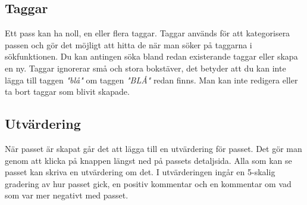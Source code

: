 \documentclass{article}
\newcommand{\button}[1]{{\tcbox{\textcolor{detail}{#1}}}}
\begin{document}
{    \subsection{Taggar}
        Ett pass kan ha noll, en eller flera taggar. Taggar används för att kategorisera passen och gör det möjligt att hitta de när man söker på taggarna i sökfunktionen. Du kan antingen söka bland redan existerande taggar eller skapa en ny. Taggar ignorerar små och stora bokstäver, det betyder att du kan inte lägga till taggen \textit{"blå"} om taggen \textit{"BLÅ"} redan finns. Man kan inte redigera eller ta bort taggar som blivit skapade.

    \subsection{Utvärdering}
        När passet är skapat går det att lägga till en utvärdering för passet. Det gör man genom att klicka på knappen \button{Utvärdering} längst ned på passets detaljsida. Alla som kan se passet kan skriva en utvärdering om det. I utvärderingen ingår en 5-skalig gradering av hur passet gick, en positiv kommentar och en kommentar om vad som var mer negativt med passet.

    \newpage
}
\end{document}
